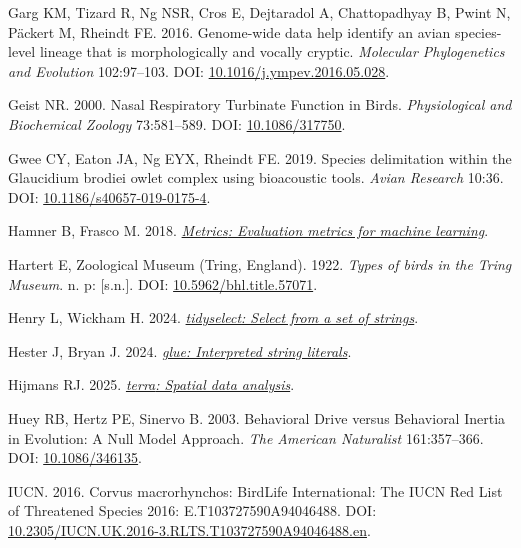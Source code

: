 \documentclass[10pt,a4paper]{article}
\newlength{\cslhangindent}
\newenvironment{CSLReferences}[2] %
 {\begin{list}{}{%
  \setlength{\itemindent}{0pt}
  \setlength{\leftmargin}{0pt}
  \setlength{\parsep}{0pt}
  \ifodd #1
   \setlength{\leftmargin}{\cslhangindent}
   \setlength{\itemindent}{-1\cslhangindent}
  \fi
  \setlength{\itemsep}{#2\baselineskip}}}
 {\end{list}}
\begin{document}
\begin{CSLReferences}{1}{0}
Garg KM, Tizard R, Ng NSR, Cros E, Dejtaradol A, Chattopadhyay B, Pwint N, Päckert M, Rheindt FE. 2016. Genome-wide data help identify an avian species-level lineage that is morphologically and vocally cryptic. \emph{Molecular Phylogenetics and Evolution} 102:97--103. DOI: \href{https://doi.org/10.1016/j.ympev.2016.05.028}{10.1016/j.ympev.2016.05.028}.

Geist NR. 2000. Nasal {Respiratory} {Turbinate} {Function} in {Birds}. \emph{Physiological and Biochemical Zoology} 73:581--589. DOI: \href{https://doi.org/10.1086/317750}{10.1086/317750}.

Gwee CY, Eaton JA, Ng EYX, Rheindt FE. 2019. Species delimitation within the {Glaucidium} brodiei owlet complex using bioacoustic tools. \emph{Avian Research} 10:36. DOI: \href{https://doi.org/10.1186/s40657-019-0175-4}{10.1186/s40657-019-0175-4}.

Hamner B, Frasco M. 2018. \emph{\href{https://CRAN.R-project.org/package=Metrics}{{Metrics}: Evaluation metrics for machine learning}}.

Hartert E, Zoological Museum (Tring, England). 1922. \emph{Types of birds in the {Tring} {Museum}}. n. p: {[}s.n.{]}. DOI: \href{https://doi.org/10.5962/bhl.title.57071}{10.5962/bhl.title.57071}.

Henry L, Wickham H. 2024. \emph{\href{https://CRAN.R-project.org/package=tidyselect}{{tidyselect}: Select from a set of strings}}.

Hester J, Bryan J. 2024. \emph{\href{https://CRAN.R-project.org/package=glue}{{glue}: Interpreted string literals}}.

Hijmans RJ. 2025. \emph{\href{https://CRAN.R-project.org/package=terra}{{terra}: Spatial data analysis}}.

Huey RB, Hertz PE, Sinervo B. 2003. Behavioral {Drive} versus {Behavioral} {Inertia} in {Evolution}: {A} {Null} {Model} {Approach}. \emph{The American Naturalist} 161:357--366. DOI: \href{https://doi.org/10.1086/346135}{10.1086/346135}.

IUCN. 2016. Corvus macrorhynchos: {BirdLife} {International}: {The} {IUCN} {Red} {List} of {Threatened} {Species} 2016: E.{T103727590A94046488}. DOI: \href{https://doi.org/10.2305/IUCN.UK.2016-3.RLTS.T103727590A94046488.en}{10.2305/IUCN.UK.2016-3.RLTS.T103727590A94046488.en}.


\end{CSLReferences}
\end{document}
